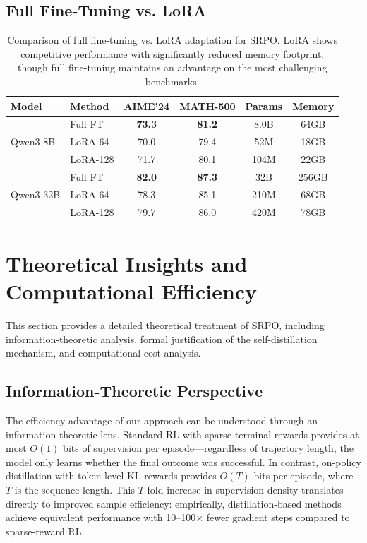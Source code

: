 \documentclass{article}
\newcommand{\method}{SRPO}
\theoremstyle{plain}
\theoremstyle{definition}
\theoremstyle{remark}
\begin{document}
\subsection{Full Fine-Tuning vs. LoRA}

\begin{table}[h]
\centering
\caption{Comparison of full fine-tuning vs. LoRA adaptation for \method{}. LoRA shows competitive performance with significantly reduced memory footprint, though full fine-tuning maintains an advantage on the most challenging benchmarks.}
\label{tab:lora_appendix}
\vspace{0.5em}
\begin{tabular}{@{}llcccc@{}}
\toprule
\textbf{Model} & \textbf{Method} & \textbf{AIME'24} & \textbf{MATH-500} & \textbf{Params} & \textbf{Memory} \\
\midrule
\multirow{3}{*}{Qwen3-8B}
& Full FT & \textbf{73.3} & \textbf{81.2} & 8.0B & 64GB \\
& LoRA-64 & 70.0 & 79.4 & 52M & 18GB \\
& LoRA-128 & 71.7 & 80.1 & 104M & 22GB \\
\midrule
\multirow{3}{*}{Qwen3-32B}
& Full FT & \textbf{82.0} & \textbf{87.3} & 32B & 256GB \\
& LoRA-64 & 78.3 & 85.1 & 210M & 68GB \\
& LoRA-128 & 79.7 & 86.0 & 420M & 78GB \\
\bottomrule
\end{tabular}
\end{table}

\newpage
\section{Theoretical Insights and Computational Efficiency}
\label{appendix:theory}

This section provides a detailed theoretical treatment of SRPO, including information-theoretic analysis, formal justification of the self-distillation mechanism, and computational cost analysis.

\subsection{Information-Theoretic Perspective}

The efficiency advantage of our approach can be understood through an information-theoretic lens.
Standard RL with sparse terminal rewards provides at most $O(1)$ bits of supervision per episode—regardless of trajectory length, the model only learns whether the final outcome was successful.
In contrast, on-policy distillation with token-level KL rewards provides $O(T)$ bits per episode, where $T$ is the sequence length.
This $T$-fold increase in supervision density translates directly to improved sample efficiency: empirically, distillation-based methods achieve equivalent performance with 10--100$\times$ fewer gradient steps compared to sparse-reward RL.
\end{document}
